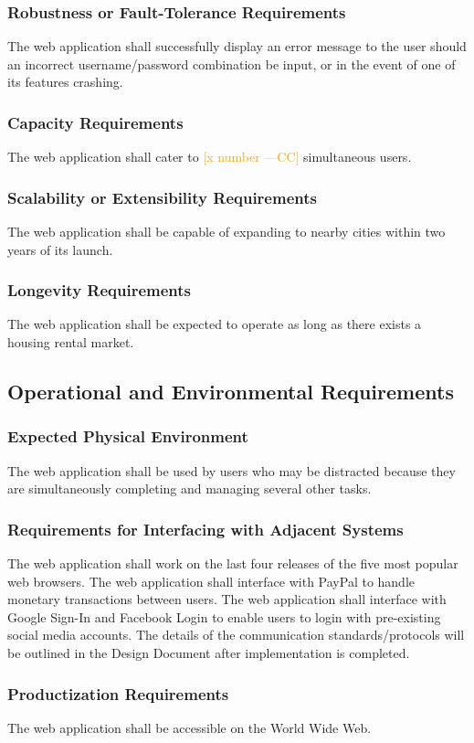 \documentclass[12pt, titlepage]{article}
\newcommand{\authornote}[3]{\textcolor{#1}{[#3 ---#2]}}
\newcommand{\authornote}[3]{}
\newcommand{\cc}[1]{\authornote{orange}{CC}{#1}}
\begin{document}
{\subsubsection{Robustness or Fault-Tolerance Requirements}
The web application shall successfully display an error message to the user should an incorrect username/password combination be input, or in the event of one of its features crashing.  
\subsubsection{Capacity Requirements}
The web application shall cater to \cc{x number} simultaneous users. 
\subsubsection{Scalability or Extensibility Requirements}
The web application shall be capable of expanding to nearby cities within two years of its launch.
\subsubsection{Longevity Requirements}
The web application shall be expected to operate as long as there exists a housing rental market.
\subsection{Operational and Environmental Requirements}
\subsubsection{Expected Physical Environment}
The web application shall be used by users who may be distracted because they are simultaneously completing and managing several other tasks. 
\subsubsection{Requirements for Interfacing with Adjacent Systems}
The web application shall work on the last four releases of the five most popular web browsers. The web application shall interface with PayPal to handle monetary transactions between users. The web application shall interface with Google Sign-In and Facebook Login to enable users to login with pre-existing social media accounts. The details of the communication standards/protocols will be outlined in the Design Document after implementation is completed.
\subsubsection{Productization Requirements}
The web application shall be accessible on the World Wide Web.
}
\end{document}
